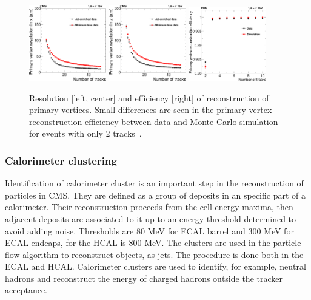 \begin{figure}[!Hhtbp]
  \begin{center}
    \includegraphics[width=0.3\textwidth]{figs/PrimaryVertexResolutionX.png}
    \includegraphics[width=0.3\textwidth]{figs/PrimaryVertexResolutionZ.png}
    \includegraphics[width=0.3\textwidth]{figs/PrimaryVertexTagAndProbeEfficiency.png}
    \caption{Resolution [left, center] and efficiency [right] of reconstruction of primary vertices. Small differences are seen in the primary vertex reconstruction efficiency between data and Monte-Carlo simulation for events with only 2 tracks~\cite{Chatrchyan:2014fea}.}
    \label{fig:VertexRec}
  \end{center}
\end{figure}

\subsubsection{Calorimeter clustering}

Identification of calorimeter cluster is an important step in the reconstruction of particles in CMS. They are defined as a group of deposits in an specific part of a calorimeter. Their reconstruction proceeds from the cell energy maxima, then adjacent deposits are associated to it up to an energy threshold determined to avoid adding noise. Thresholds are 80 MeV for ECAL barrel and 300 MeV for ECAL endcaps, for the HCAL is 800 MeV. The clusters are used in the particle flow algorithm to reconstruct objects, as jets. The procedure is done both in the ECAL and HCAL. Calorimeter clusters are used to identify, for example, neutral hadrons and reconstruct the energy of charged hadrons outside the tracker acceptance.    

